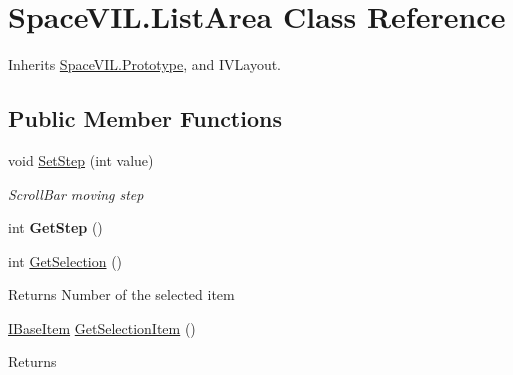 \hypertarget{class_space_v_i_l_1_1_list_area}{}\section{Space\+V\+I\+L.\+List\+Area Class Reference}
\label{class_space_v_i_l_1_1_list_area}


Inherits \mbox{\hyperlink{class_space_v_i_l_1_1_prototype}{Space\+V\+I\+L.\+Prototype}}, and I\+V\+Layout.

\subsection*{Public Member Functions}
\begin{DoxyCompactItemize}
\item 
void \mbox{\hyperlink{class_space_v_i_l_1_1_list_area_a4092a62f4f548a9289632a91cd8d452a}{Set\+Step}} (int value)
\begin{DoxyCompactList}\small\item\em Scroll\+Bar moving step \end{DoxyCompactList}\item 
\mbox{\label{class_space_v_i_l_1_1_list_area_ad4b98361d3921da08ec168b2638c5031}} 
int {\bfseries Get\+Step} ()
\item 
\mbox{\label{class_space_v_i_l_1_1_list_area_a07991a67811d7341bde2968f4703f139}} 
int \mbox{\hyperlink{class_space_v_i_l_1_1_list_area_a07991a67811d7341bde2968f4703f139}{Get\+Selection}} ()
\begin{DoxyCompactList}\small\item\em \begin{DoxyReturn}{Returns}
Number of the selected item 
\end{DoxyReturn}
\end{DoxyCompactList}\item 
\mbox{\label{class_space_v_i_l_1_1_list_area_a365f9d965afdee8da578de16dc6f7e83}} 
\mbox{\hyperlink{interface_space_v_i_l_1_1_core_1_1_i_base_item}{I\+Base\+Item}} \mbox{\hyperlink{class_space_v_i_l_1_1_list_area_a365f9d965afdee8da578de16dc6f7e83}{Get\+Selection\+Item}} ()
\begin{DoxyCompactList}\small\item\em \begin{DoxyReturn}{Returns}

\end{DoxyReturn}
\end{DoxyCompactList}
\end{DoxyCompactItemize}
